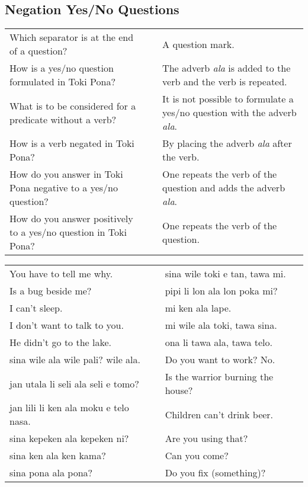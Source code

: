 \subsection*{Negation Yes/No Questions} 
\label{'negation_yes_no_questions'}
%
\begin{supertabular}{p{5,5cm}|ll}
Which separator is at the end of a question? && A question mark. \\ %
How is a yes/no question formulated in Toki Pona? && The adverb \textit{ala} is added to the verb and the verb is repeated.  \\ %
What is to be considered for a predicate without a verb? &&  It is not possible to formulate a yes/no question with the adverb \textit{ala}. \\ %
How is a verb negated in Toki Pona? && By placing the adverb \textit{ala} after the verb.  \\ %
How do you answer in Toki Pona negative to a yes/no question? && One repeats the verb of the question and adds the adverb \textit{ala}. \\ %
How do you answer positively to a yes/no question in Toki Pona? && One repeats the verb of the question. \\ %
\end{supertabular} 

\begin{supertabular}{p{5,5cm}|ll}
You have to tell me why.  && sina wile toki e tan, tawa mi. \\ %
Is a bug beside me?  && pipi li lon ala lon poka mi? \\ %
I can't sleep.  && mi ken ala lape. \\ %
I don't want to talk to you.  && mi wile ala toki, tawa sina. \\ %
He didn't go to the lake.  && ona li tawa ala, tawa telo. \\ %
sina wile ala wile pali? wile ala.  && Do you want to work? No. \\
jan utala li seli ala seli e tomo?  && Is the warrior burning the house? \\
jan lili li ken ala moku e telo nasa.  && Children can't drink beer. \\
sina kepeken ala kepeken ni?  && Are you using that? \\
sina ken ala ken kama?  && Can you come? \\
sina pona ala pona? && Do you fix (something)? \\
\end{supertabular} 

